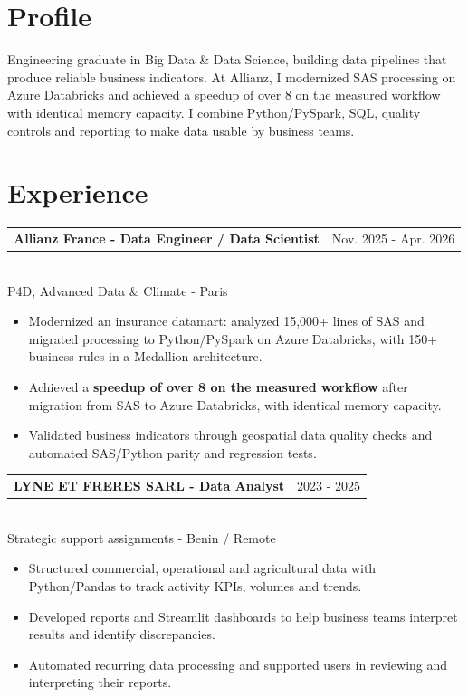 \documentclass[10pt,a4paper]{article}
\makeatletter
\newcommand{\role}[3]{%
  \vspace{3pt}
  \begin{tabularx}{\linewidth}{@{}Xr@{}}
  \textbf{#1} & {\color{muted}#2}
  \end{tabularx}\vspace{0.8pt}\\
  {\color{muted}#3}\par
  \vspace{3pt}
}
\makeatother
\begin{document}
\begin{lrbox}{\maincolumnbox}
\begin{minipage}[t]{0.695\textwidth}
\vspace{0pt}
\raggedright

\section{Profile}
Engineering graduate in Big Data \& Data Science, building data pipelines that produce reliable business indicators. At Allianz, I modernized SAS processing on Azure Databricks and achieved a speedup of over 8\texttimes{} on the measured workflow with identical memory capacity. I combine Python/PySpark, SQL, quality controls and reporting to make data usable by business teams.

\section{Experience}
\role{Allianz France - Data Engineer / Data Scientist}{Nov. 2025 - Apr. 2026}{P4D, Advanced Data \& Climate - Paris}
\begin{itemize}
  \item Modernized an insurance datamart: analyzed 15,000+ lines of SAS and migrated processing to Python/PySpark on Azure Databricks, with 150+ business rules in a Medallion architecture.
  \item Achieved a \textbf{speedup of over 8\texttimes{} on the measured workflow} after migration from SAS to Azure Databricks, with identical memory capacity.
  \item Validated business indicators through geospatial data quality checks and automated SAS/Python parity and regression tests.
\end{itemize}

\vspace{8pt}
\role{LYNE ET FRERES SARL - Data Analyst}{2023 - 2025}{Strategic support assignments - Benin / Remote}
\begin{itemize}
  \item Structured commercial, operational and agricultural data with Python/Pandas to track activity KPIs, volumes and trends.
  \item Developed reports and Streamlit dashboards to help business teams interpret results and identify discrepancies.
  \item Automated recurring data processing and supported users in reviewing and interpreting their reports.
\end{itemize}


\end{minipage}
\end{lrbox}
\end{document}
